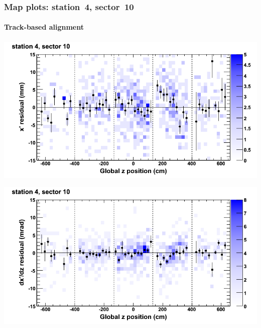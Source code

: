 \documentclass[compress]{beamer}
\begin{document}
\begin{frame}
\frametitle{Map plots: station~4, sector~10}
\framesubtitle{Track-based alignment}
\includegraphics[width=0.5\linewidth]{mapplots_re05/DTvsz_st4sec10_x.png}

\includegraphics[width=0.5\linewidth]{mapplots_re05/DTvsz_st4sec10_dxdz.png}
\end{frame}
\end{document}
